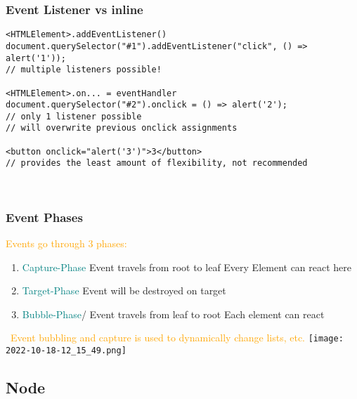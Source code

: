 \documentclass[main.tex,fontsize=6pt,paper=a4,paper=landscape,DIV=calc,]{scrartcl}
\begin{document}
\begin{multicols*}{4}
\begin{itemize}
\end{itemize}

\subsubsection{Event Listener vs inline}  
\begin{lstlisting}
<HTMLElement>.addEventListener()
document.querySelector("#1").addEventListener("click", () => alert('1'));
// multiple listeners possible!

<HTMLElement>.on... = eventHandler
document.querySelector("#2").onclick = () => alert('2');
// only 1 listener possible
// will overwrite previous onclick assignments

<button onclick="alert('3')">3</button>
// provides the least amount of flexibility, not recommended
\end{lstlisting}
\, \newline

\subsubsection{Event Phases} 
\textcolor{orange}{Events go through 3 phases:}\newline
\begin{enumerate}
  \item \textcolor{teal}{Capture-Phase}\newline
    Event travels from root to leaf\newline
    Every Element can react here
  \item \textcolor{teal}{Target-Phase}\newline
    Event will be destroyed on target
  \item \textcolor{teal}{Bubble-Phase}\newline/
    Event travels from leaf to root\newline
    Each element can react
\end{enumerate}
\, \newline
\textcolor{orange}{Event bubbling and capture is used to dynamically change lists, etc.}
\texttt{[image: 2022-10-18-12\_15\_49.png]}

\subsection{Node}


\end{multicols*}
\end{document}
